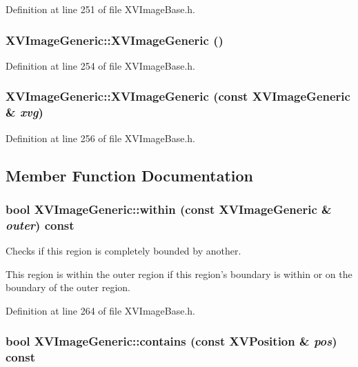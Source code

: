 Definition at line 251 of file XVImage\-Base.h.\label{XVImageGeneric_a3}
\hypertarget{class_XVImageGeneric_a3}{
\subsubsection[XVImageGeneric]{\setlength{\rightskip}{0pt plus 5cm}XVImage\-Generic::XVImage\-Generic ()}}




Definition at line 254 of file XVImage\-Base.h.\label{XVImageGeneric_a4}
\hypertarget{class_XVImageGeneric_a4}{
\subsubsection[XVImageGeneric]{\setlength{\rightskip}{0pt plus 5cm}XVImage\-Generic::XVImage\-Generic (const XVImage\-Generic \& {\em xvg})}}




Definition at line 256 of file XVImage\-Base.h.

\subsection{Member Function Documentation}
\label{XVImageGeneric_a5}
\hypertarget{class_XVImageGeneric_a5}{
\subsubsection[within]{\setlength{\rightskip}{0pt plus 5cm}bool XVImage\-Generic::within (const XVImage\-Generic \& {\em outer}) const}}


Checks if this region is completely bounded by another.

This region is within the outer region if this region's boundary is within or on the boundary of the outer region. 

Definition at line 264 of file XVImage\-Base.h.\label{XVImageGeneric_a6}
\hypertarget{class_XVImageGeneric_a6}{
\subsubsection[contains]{\setlength{\rightskip}{0pt plus 5cm}bool XVImage\-Generic::contains (const XVPosition \& {\em pos}) const}}


